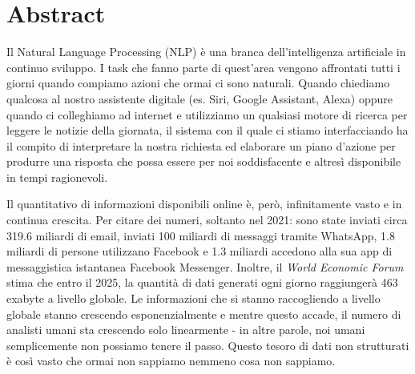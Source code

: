 \section{Abstract}  \label{intro_abstract}
Il Natural Language Processing (NLP) è una branca dell'intelligenza artificiale in continuo sviluppo. I task che fanno parte di quest'area vengono affrontati tutti i giorni quando compiamo azioni che ormai ci sono naturali. Quando chiediamo qualcosa al nostro assistente digitale (es. Siri, Google Assistant, Alexa) oppure quando ci colleghiamo ad internet e utilizziamo un qualsiasi motore di ricerca per leggere le notizie della giornata, il sistema con il quale ci stiamo interfacciando ha il compito di interpretare la nostra richiesta ed elaborare un piano d'azione per produrre una risposta che possa essere per noi soddisfacente e altresì disponibile in tempi ragionevoli.


Il quantitativo di informazioni disponibili online è, però, infinitamente vasto e in continua crescita. Per citare dei numeri, soltanto nel 2021: sono state inviati circa 319.6 miliardi di email\textsuperscript{\cite{statista_email}}, inviati 100 miliardi di messaggi tramite WhatsApp\textsuperscript{\cite{statistics_whatsapp}}, 1.8 miliardi di persone utilizzano Facebook e 1.3 miliardi accedono alla sua app di messaggistica istantanea Facebook Messenger\textsuperscript{\cite{statistics_facebook}}. Inoltre, il \textit{World Economic Forum}\cite{wef_dataperday} stima che entro il 2025, la quantità di dati generati ogni giorno raggiungerà 463 exabyte a livello globale. Le informazioni che si stanno raccogliendo a livello globale stanno crescendo esponenzialmente e mentre questo accade, il numero di analisti umani sta crescendo solo linearmente - in altre parole, noi umani semplicemente non possiamo tenere il passo. Questo tesoro di dati non strutturati è così vasto che ormai non sappiamo nemmeno cosa non sappiamo.

